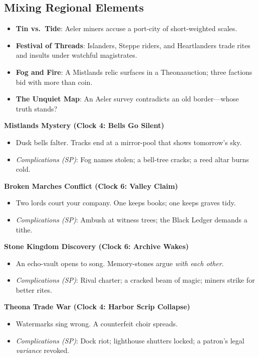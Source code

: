 \subsection*{Mixing Regional Elements}
\begin{itemize}
\item \textbf{Tin vs.\ Tide}: Aeler miners accuse a port-city of short-weighted scales.
\item \textbf{Festival of Threads}: Islanders, Steppe riders, and Heartlanders trade rites and insults under watchful magistrates.
\item \textbf{Fog and Fire}: A Mistlands relic surfaces in a Theonaauction; three factions bid with more than coin.
\item \textbf{The Unquiet Map}: An Aeler survey contradicts an old border—whose truth stands?
\end{itemize}

\begin{tcolorbox}[colback=blue!5!white,colframe=blue!75!black,title=Regional Adventure Seeds,fonttitle=\bfseries]
\textbf{Mistlands Mystery (Clock 4: Bells Go Silent)}
\begin{itemize}
\item Dusk bells falter. Tracks end at a mirror-pool that shows tomorrow's sky.
\item \emph{Complications (SP)}: Fog names stolen; a bell-tree cracks; a reed altar burns cold.
\end{itemize}

\textbf{Broken Marches Conflict (Clock 6: Valley Claim)}
\begin{itemize}
\item Two lords court your company. One keeps books; one keeps graves tidy.
\item \emph{Complications (SP)}: Ambush at witness trees; the Black Ledger demands a tithe.
\end{itemize}

\textbf{Stone Kingdom Discovery (Clock 6: Archive Wakes)}
\begin{itemize}
\item An echo-vault opens to song. Memory-stones argue \emph{with each other}.
\item \emph{Complications (SP)}: Rival charter; a cracked beam of magic; miners strike for better rites.
\end{itemize}

\textbf{Theona Trade War (Clock 4: Harbor Scrip Collapse)}
\begin{itemize}
\item Watermarks sing wrong. A counterfeit choir spreads.
\item \emph{Complications (SP)}: Dock riot; lighthouse shutters locked; a patron's legal \emph{variance} revoked.
\end{itemize}
\end{tcolorbox}

